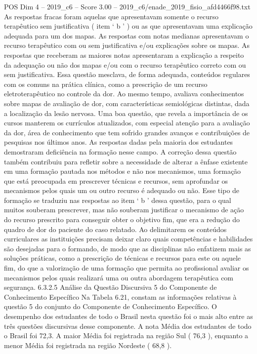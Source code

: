 \begin{textsample}{POS Dim 4 – 2019\_c6 – Score 3.00 – 2019\_c6/enade\_2019\_fisio\_afd4466f98.txt}
As respostas fracas foram aquelas que apresentavam somente o recurso terapêutico sem justificativa ( item ‘ b ’ ) ou as que apresentavam uma explicação adequada para um dos mapas.
As respostas com notas medianas apresentavam o recurso terapêutico com ou sem justificativa e/ou explicações sobre os mapas.
As respostas que receberam as maiores notas apresentaram a explicação a respeito da adequação ou não dos mapas e/ou com o recurso terapêutico correto com ou sem justificativa.
Essa questão mesclava, de forma adequada, conteúdos regulares com os comuns na prática clínica, como a prescrição de um recurso eletroterapêutico no controle da dor.
Ao mesmo tempo, avaliava conhecimentos sobre mapas de avaliação de dor, com características semiológicas distintas, dada a localização da lesão nervosa.
Uma boa questão, que revela a importância de os cursos manterem os currículos atualizados, com especial atenção para a avaliação da dor, área de conhecimento que tem sofrido grandes avanços e contribuições de pesquisas nos últimos anos.
As respostas dadas pela maioria dos estudantes demostraram deficiência na formação nesse campo.
A correção dessa questão também contribuiu para refletir sobre a necessidade de alterar a ênfase existente em uma formação pautada nos métodos e não nos mecanismos, uma formação que está preocupada em prescrever técnicas e recursos, sem aprofundar os mecanismos pelos quais um ou outro recurso é adequado ou não.
Esse tipo de formação se traduziu nas respostas ao item ‘ b ’ dessa questão, para o qual muitos souberam prescrever, mas não souberam justificar o mecanismo de ação do recurso prescrito para conseguir obter o objetivo fim, que era a redução do quadro de dor do paciente do caso relatado.
Ao delimitarem os conteúdos curriculares as instituições precisam deixar claro quais competências e habilidades são desejadas para o formando, de modo que as disciplinas não enfatizem mais as soluções práticas, como a prescrição de técnicas e recursos para este ou aquele fim, do que a valorização de uma formação que permita ao profissional avaliar os mecanismos pelos quais realizará uma ou outra abordagem terapêutica com segurança. 6.3.2.5 Análise da Questão Discursiva 5 do Componente de Conhecimento Específico Na Tabela 6.21, constam as informações relativas à questão 5 do conjunto do Componente de Conhecimento Específico.
O desempenho dos estudantes de todo o Brasil nesta questão foi o mais alto entre as três questões discursivas desse componente.
A nota Média dos estudantes de todo o Brasil foi 72,3.
A maior Média foi registrada na região Sul ( 76,3 ), enquanto a menor Média foi registrada na região Nordeste ( 68,8 ).

\end{textsample}
